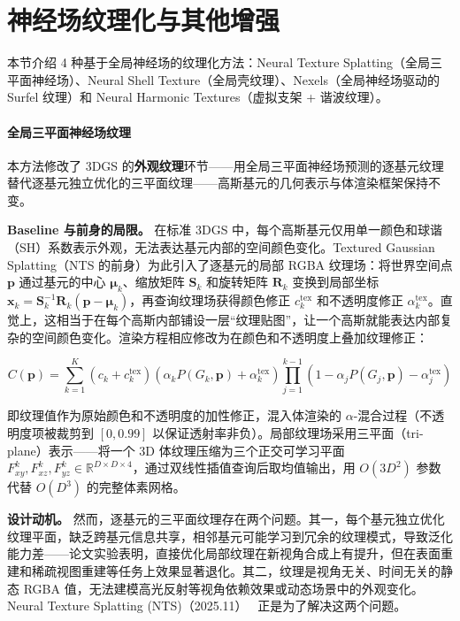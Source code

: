 

\section{神经场纹理化与其他增强}
\label{sec:03_2}

本节介绍 4 种基于全局神经场的纹理化方法：Neural Texture Splatting（全局三平面神经场）、Neural Shell Texture（全局壳纹理）、Nexels（全局神经场驱动的 Surfel 纹理）和 Neural Harmonic Textures（虚拟支架 + 谐波纹理）。

\paragraph{全局三平面神经场纹理}

本方法修改了 3DGS 的\textbf{外观纹理}环节——用全局三平面神经场预测的逐基元纹理替代逐基元独立优化的三平面纹理——高斯基元的几何表示与体渲染框架保持不变。

\smallskip
\noindent\textbf{Baseline 与前身的局限。}
在标准 3DGS 中，每个高斯基元仅用单一颜色和球谐（SH）系数表示外观，无法表达基元内部的空间颜色变化。Textured Gaussian Splatting（NTS 的前身）为此引入了逐基元的局部 RGBA 纹理场：将世界空间点 $\mathbf{p}$ 通过基元的中心 $\boldsymbol{\mu}_k$、缩放矩阵 $\mathbf{S}_k$ 和旋转矩阵 $\mathbf{R}_k$ 变换到局部坐标 $\mathbf{x}_k = \mathbf{S}_k^{-1}\mathbf{R}_k(\mathbf{p} - \boldsymbol{\mu}_k)$，再查询纹理场获得颜色修正 $c_k^{\text{tex}}$ 和不透明度修正 $\alpha_k^{\text{tex}}$。直觉上，这相当于在每个高斯内部铺设一层“纹理贴图”，让一个高斯就能表达内部复杂的空间颜色变化。渲染方程相应修改为在颜色和不透明度上叠加纹理修正：

\begin{equation}
C(\mathbf{p}) = \sum_{k=1}^{K} (c_k + c_k^{\text{tex}})(\alpha_k P(G_k, \mathbf{p}) + \alpha_k^{\text{tex}}) \prod_{j=1}^{k-1}(1 - \alpha_j P(G_j, \mathbf{p}) - \alpha_j^{\text{tex}})
\end{equation}

即纹理值作为原始颜色和不透明度的加性修正，混入体渲染的 $\alpha$-混合过程（不透明度项被裁剪到 $[0, 0.99]$ 以保证透射率非负）。局部纹理场采用三平面（tri-plane）表示——将一个 3D 体纹理压缩为三个正交可学习平面 $F_{xy}^k, F_{xz}^k, F_{yz}^k \in \mathbb{R}^{D \times D \times 4}$，通过双线性插值查询后取均值输出，用 $O(3D^2)$ 参数代替 $O(D^3)$ 的完整体素网格。

\smallskip
\noindent\textbf{设计动机。}
然而，逐基元的三平面纹理存在两个问题。其一，每个基元独立优化纹理平面，缺乏跨基元信息共享，相邻基元可能学习到冗余的纹理模式，导致泛化能力差——论文实验表明，直接优化局部纹理在新视角合成上有提升，但在表面重建和稀疏视图重建等任务上效果显著退化。其二，纹理是视角无关、时间无关的静态 RGBA 值，无法建模高光反射等视角依赖效果或动态场景中的外观变化。Neural Texture Splatting (NTS)（2025.11）~\cite{2511_18873} 正是为了解决这两个问题。

